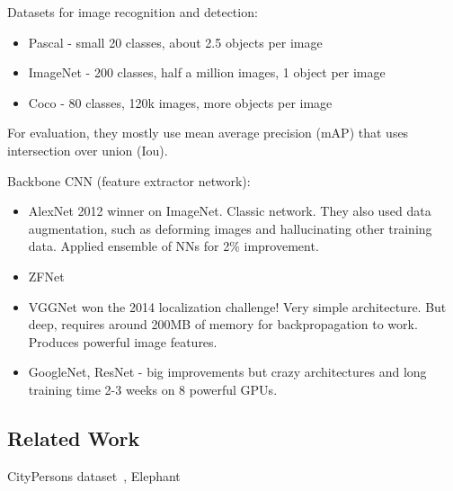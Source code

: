 Datasets for image recognition and detection:
\begin{itemize}
\item Pascal - small 20 classes, about 2.5 objects per image
\item ImageNet - 200 classes, half a million images, 1 object per image
\item Coco - 80 classes, 120k images, more objects per image
\end{itemize}

For evaluation, they mostly use mean average precision (mAP) that uses intersection over union (Iou).

Backbone CNN (feature extractor network):
\begin{itemize}
\item AlexNet 2012 winner on ImageNet. Classic network. They also used data augmentation, such as deforming images and hallucinating other training data. Applied ensemble of NNs for 2\% improvement.
\item ZFNet
\item VGGNet won the 2014 localization challenge! Very simple architecture. But deep, requires around 200MB of memory for backpropagation to work. Produces powerful image features.
\item GoogleNet, ResNet - big improvements but crazy architectures and long training time 2-3 weeks on 8 powerful GPUs.
\end{itemize}

\subsection{Related Work}
CityPersons dataset~\cite{citypersons}, Elephant~\cite{elephant}
